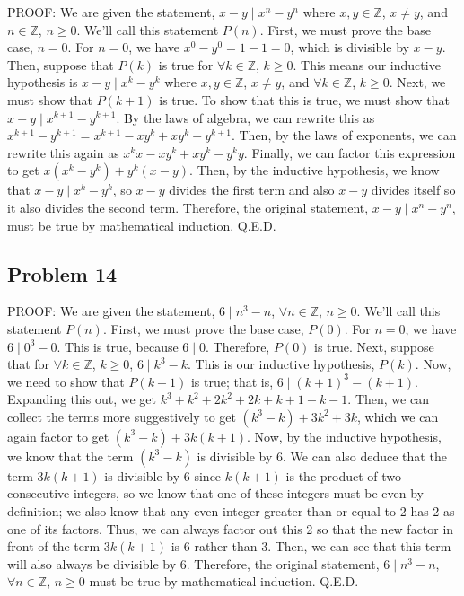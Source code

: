 \documentclass{article}
\begin{document}
PROOF: We are given the statement, $x-y \mid x^n - y^n$ where $x,y \in \mathbb{Z}$, $x \neq y$, and $n \in \mathbb{Z}$, $n \geq 0$. We'll call this statement $P(n)$. First, we must prove the base case, $n=0$. For $n=0$, we have $x^0 - y^0 = 1-1 = 0$, which is divisible by $x-y$. Then, suppose that $P(k)$ is true for $\forall k \in \mathbb{Z}$, $k \geq 0$. This means our inductive hypothesis is $x-y \mid x^k - y^k$ where $x,y \in \mathbb{Z}$, $x \neq y$, and $\forall k \in \mathbb{Z}$, $k \geq 0$. Next, we must show that $P(k+1)$ is true. To show that this is true, we must show that $x-y \mid x^{k+1} - y^{k+1}$. By the laws of algebra, we can rewrite this as $x^{k+1} - y^{k+1} = x^{k+1} - xy^{k}+xy^{k} - y^{k+1}$. Then, by the laws of exponents, we can rewrite this again as $x^{k}x - xy^{k}+xy^{k} - y^{k}y$. Finally, we can factor this expression to get $ x(x^{k}-y^{k}) + y^{k}(x-y)$. Then, by the inductive hypothesis, we know that $x-y \mid x^k - y^k$, so $x-y$ divides the first term and also $x-y$ divides itself so it also divides the second term. Therefore, the original statement, $x-y \mid x^n - y^n$, must be true by mathematical induction. Q.E.D.

\subsection*{Problem 14}

PROOF: We are given the statement, $6 \mid n^{3}-n$, $\forall n \in \mathbb{Z}$, $n \geq 0$. We'll call this statement $P(n)$. First, we must prove the base case, $P(0)$. For $n=0$, we have $6 \mid 0^{3}-0$. This is true, because $6 \mid 0$. Therefore, $P(0)$ is true. Next, suppose that for $\forall k \in \mathbb{Z}$, $k \geq 0$, $6 \mid k^{3}-k$. This is our inductive hypothesis, $P(k)$. Now, we need to show that $P(k+1)$ is true; that is, $6 \mid (k+1)^{3}-(k+1)$. Expanding this out, we get $k^{3} + k^{2} +2k^{2}+2k+k+1-k-1$. Then, we can collect the terms more suggestively to get $(k^{3}-k) + 3k^{2} + 3k$, which we can again factor to get $(k^{3}-k) + 3k(k + 1)$. Now, by the inductive hypothesis, we know that the term $(k^{3}-k)$ is divisible by 6. We can also deduce that the term $3k(k + 1)$ is divisible by 6 since $k(k+1)$ is the product of two consecutive integers, so we know that one of these integers must be even by definition; we also know that any even integer greater than or equal to 2 has 2 as one of its factors. Thus, we can always factor out this 2 so that the new factor in front of the term $3k(k + 1)$ is 6 rather than 3. Then, we can see that this term will also always be divisible by 6. Therefore, the original statement, $6 \mid n^{3}-n$, $\forall n \in \mathbb{Z}$, $n \geq 0$ must be true by mathematical induction. Q.E.D.
\end{document}
